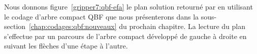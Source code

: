 Nous donnons figure~\ref{gripper7:qbf-efa} le plan solution retourné par \touistplan en utilisant le codage d'arbre compact QBF que nous présenterons dans la sous-section~\ref{chap:codages:qbf:nouveaux} du prochain chapitre. La lecture du plan s'effectue par un parcours de l'arbre compact développé de gauche à droite en suivant les flèches d'une étape à l'autre.\\

%
%

